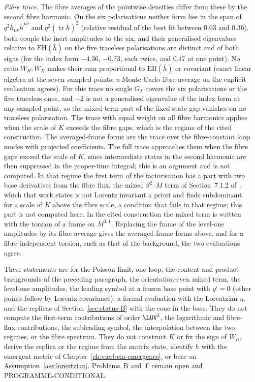 \emph{Fibre trace.} The fibre averages of the pointwise densities differ from these by the second fibre harmonic. On the six polarisations neither form lies in the span of \(q^2\bar h_{\mu\nu}\bar h^{\mu\nu}\) and \(q^2(\operatorname{tr}\bar h)^2\) (relative residual of the best fit between \(0.03\) and \(0.36\)), both couple the inert amplitudes to the six, and their generalised eigenvalues relative to \(\mathrm{EH}(\bar h)\) on the five traceless polarisations are distinct and of both signs (for the index form \(-4.36\), \(-0.73\), each twice, and \(0.47\) at one point). No ratio \(W_R:W_X\) makes their sum proportional to \(\mathrm{EH}(\bar h)\) or covariant (exact linear algebra at the seven sampled points; a Monte Carlo fibre average on the explicit realisation agrees). For this trace no single \(G_T\) covers the six polarisations or the five traceless ones, and \(-2\) is not a generalised eigenvalue of the index form at any sampled point, so the mixed-term part of the fixed-state gap vanishes on no traceless polarisation. The trace with equal weight on all fibre harmonics applies when the scale of \(K\) exceeds the fibre gaps, which is the regime of the cited construction. The averaged-frame forms are the trace over the fibre-constant loop modes with projected coefficients. The full trace approaches them when the fibre gaps exceed the scale of \(K\), since intermediate states in the second harmonic are then suppressed in the proper-time integral; this is an argument and is not computed. In that regime the first term of the factorisation has a part with two base derivatives from the fibre flux, the mixed \(S^2\)--\(M\) term of Section~7.1.2 of~\cite{Steinacker2023}, which that work states is not Lorentz invariant a priori and finds subdominant for a scale of \(K\) above the fibre scale, a condition that fails in that regime; this part is not computed here. In the cited construction the mixed term is written with the torsion of a frame on \(M^{3,1}\). Replacing the frame of the level-one amplitudes by its fibre average gives the averaged-frame forms above, and for a fibre-independent torsion, such as that of the background, the two evaluations agree.

These statements are for the Poisson limit, one loop, the content and product backgrounds of the preceding paragraph, the orientation-even mixed term, the level-one amplitudes, the leading symbol at a frozen base point with \(y^i=0\) (other points follow by Lorentz covariance), a formal evaluation with the Lorentzian \(\eta\), and the replicas of Section~\ref{sec:status-B} with the cone in the base. They do not compute the first-term contributions of order \(\LUV^2\), the logarithmic and fibre-flux contributions, the subleading symbol, the interpolation between the two regimes, or the fibre spectrum. They do not construct \(K\) or fix the sign of \(W_R\), derive the replica or the regime from the matrix state, identify \(\bar h\) with the emergent metric of Chapter~\ref{ch:vierbein-emergence}, or bear on Assumption~\ref{ass:lorentzian}. Problems~B and~F remain open and PROGRAMME-CONDITIONAL.
